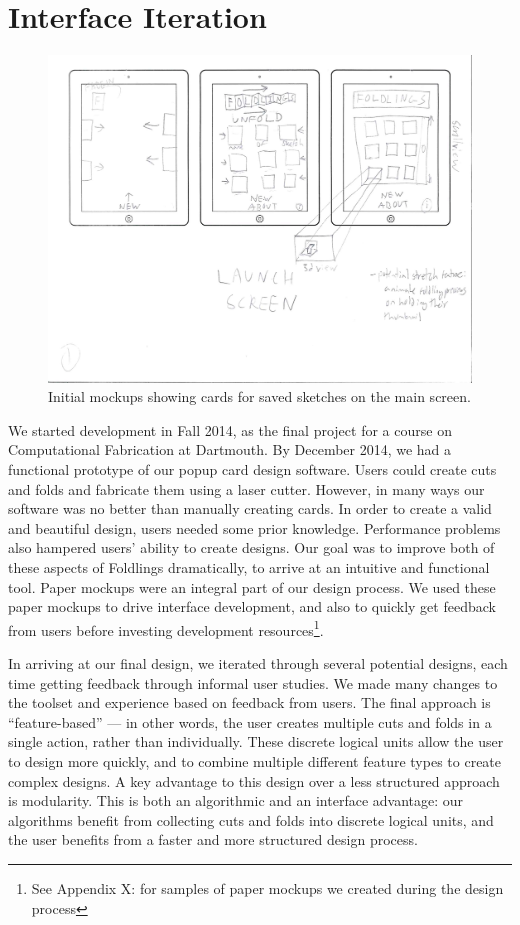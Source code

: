 \section{Interface Iteration}\label{interface-iteration}

\begin{figure}[htbp]
\centering
\includegraphics{figures/90_Appendix_UI_Mockups/001.png}
\caption{Initial mockups showing cards for saved sketches on the main
screen.}
\end{figure}

We started development in Fall 2014, as the final project for a course
on Computational Fabrication at Dartmouth. By December 2014, we had a
functional prototype of our popup card design software. Users could
create cuts and folds and fabricate them using a laser cutter. However,
in many ways our software was no better than manually creating cards. In
order to create a valid and beautiful design, users needed some prior
knowledge. Performance problems also hampered users' ability to create
designs. Our goal was to improve both of these aspects of Foldlings
dramatically, to arrive at an intuitive and functional tool. Paper
mockups were an integral part of our design process. We used these paper
mockups to drive interface development, and also to quickly get feedback
from users before investing development resources\footnote{See Appendix
  X: for samples of paper mockups we created during the design process}.

In arriving at our final design, we iterated through several potential
designs, each time getting feedback through informal user studies. We
made many changes to the toolset and experience based on feedback from
users. The final approach is ``feature-based'' --- in other words, the
user creates multiple cuts and folds in a single action, rather than
individually. These discrete logical units allow the user to design more
quickly, and to combine multiple different feature types to create
complex designs. A key advantage to this design over a less structured
approach is modularity. This is both an algorithmic and an interface
advantage: our algorithms benefit from collecting cuts and folds into
discrete logical units, and the user benefits from a faster and more
structured design process.

